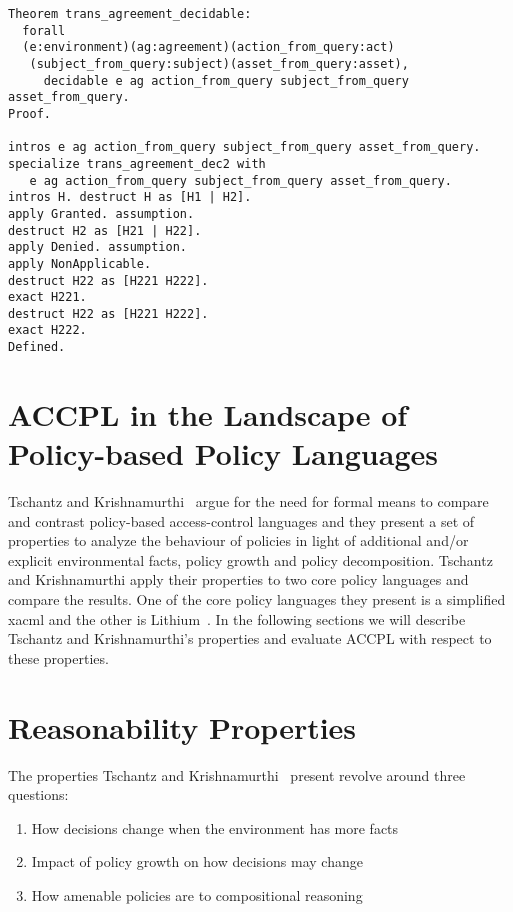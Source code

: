 \begin{lstlisting}
Theorem trans_agreement_decidable:
  forall
  (e:environment)(ag:agreement)(action_from_query:act)
   (subject_from_query:subject)(asset_from_query:asset),
     decidable e ag action_from_query subject_from_query asset_from_query.
Proof.

intros e ag action_from_query subject_from_query asset_from_query.
specialize trans_agreement_dec2 with 
   e ag action_from_query subject_from_query asset_from_query.
intros H. destruct H as [H1 | H2].
apply Granted. assumption.
destruct H2 as [H21 | H22].
apply Denied. assumption.
apply NonApplicable. 
destruct H22 as [H221 H222].
exact H221.
destruct H22 as [H221 H222].
exact H222.
Defined.

\end{lstlisting}

 
\section{ACCPL in the Landscape of Policy-based Policy Languages}

Tschantz and Krishnamurthi~\cite{Tschantz} argue for the need for formal means to compare and contrast policy-based access-control languages and they present a set of properties to analyze the behaviour of policies in light of additional and/or explicit environmental facts, policy growth and policy decomposition. Tschantz and Krishnamurthi apply their properties to two core policy languages and compare the results. One of the core policy languages they present is a simplified \ac{xacml} and the other is Lithium~\cite{Halpern2008}. In the following sections we will describe Tschantz and Krishnamurthi's properties and evaluate \ac{ACCPL} with respect to these properties.

\section{Reasonability Properties}

The properties Tschantz and Krishnamurthi~\cite{Tschantz} present revolve around three questions:

\begin{enumerate}
\item How decisions change when the environment has more facts
\item Impact of policy growth on how decisions may change
\item How amenable policies are to compositional reasoning
\end{enumerate}

